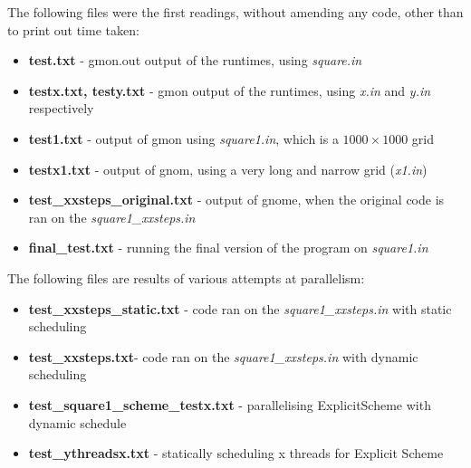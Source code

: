 \documentclass[11pt,journal]{IEEEtran}
\begin{document}
	The following files were the first readings, without amending any code, other than to print out time taken:
	
	\begin{itemize}
<<<<<<< HEAD
		\item \textbf{test.txt} - gmon.out output of the runtimes, using \emph{square.in}
		\item \textbf{testx.txt, testy.txt} - gmon output of the runtimes, using \emph{x.in} and \emph{y.in} respectively
		\item \textbf{test1.txt} - output of gmon using \emph{square1.in}, which is a $1000 \times 1000$ grid
		\item \textbf{testx1.txt} - output of gnom, using a very long and narrow grid (\emph{x1.in})
		\item \textbf{test\_xxsteps\_original.txt} - output of gnome, when the original code is ran on the \emph{square1\_xxsteps.in}
		\item \textbf{final\_test.txt} - running the final version of the program on \emph{square1.in}
		
	
	\end{itemize}

	The following files are results of various attempts at parallelism:
	\begin{itemize}
		\item \textbf{test\_xxsteps\_static.txt} - code ran on the \emph{square1\_xxsteps.in} with static scheduling
		\item \textbf{test\_xxsteps.txt}- code ran on the \emph{square1\_xxsteps.in} with dynamic scheduling
		\item \textbf{test\_square1\_scheme\_testx.txt} - parallelising ExplicitScheme with dynamic schedule
		\item \textbf{test\_ythreadsx.txt} - statically scheduling x threads for Explicit Scheme
		
	\end{itemize}
\end{document}
